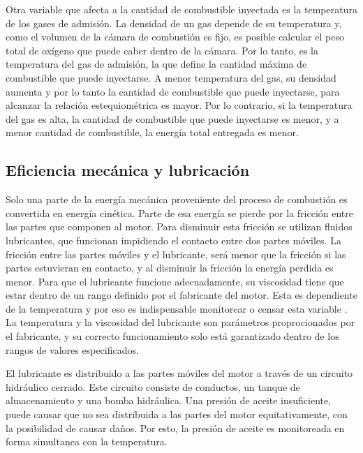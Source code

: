 Otra variable que afecta a la cantidad de combustible inyectada es la temperatura de los gases de admisión. La densidad de un gas depende de su temperatura y, como el volumen de la cámara de combustión es fijo, es posible calcular el peso total de oxígeno que puede caber dentro de la cámara. Por lo tanto, es la temperatura del gas de admisión, la que define la cantidad máxima de combustible que puede inyectarse. A menor temperatura del gas, su densidad aumenta y por lo tanto la cantidad de combustible que puede inyectarse, para alcanzar la relación estequiométrica es mayor. Por lo contrario, si la temperatura del gas es alta, la cantidad de combustible que puede inyectarse es menor, y a menor cantidad de combustible, la energía total entregada es menor.

\subsection{Eficiencia mecánica y lubricación}

Solo una parte de la energía mecánica proveniente del proceso de combustión es convertida en energía cinética. Parte de esa energía se pierde por la fricción entre las partes que componen al motor. Para disminuir esta fricción se utilizan fluidos lubricantes, que funcionan impidiendo el contacto entre dos partes móviles. La fricción entre las partes móviles y el lubricante, será menor que la fricción si las partes estuvieran en contacto, y al disminuir la fricción la energía perdida es menor. Para que el lubricante funcione adecuadamente, su viscosidad tiene que estar dentro de un rango definido por el fabricante del motor. Esta es dependiente de la temperatura y por eso es indispensable monitorear o censar esta variable \cite{lubrication}. La temperatura y la viscosidad del lubricante son parámetros proprocionados por el fabricante, y su correcto funcionamiento solo está garantizado dentro de los rangos de valores especificados.

El lubricante es distribuido a las partes móviles del motor a través de un circuito hidráulico cerrado. Este circuito consiste de conductos, un tanque de almacenamiento y una bomba hidráulica. Una presión de aceite insuficiente, puede causar que no sea distribuida a las partes del motor equitativamente, con la posibilidad de causar daños. Por esto, la presión de aceite es monitoreada en forma simultanea con la temperatura.

